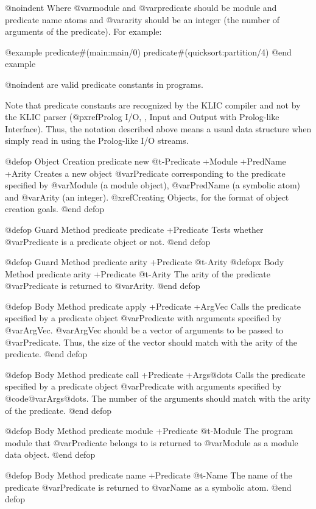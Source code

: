 {{{{@noindent
Where @var{module} and @var{predicate} should be module and predicate
name atoms and @var{arity} should be an integer (the number of arguments
of the predicate).  For example:

@example
predicate#(main:main/0)  predicate#(quicksort:partition/4)
@end example

@noindent
are valid predicate constants in programs.

Note that predicate constants are recognized by the KLIC compiler and
not by the KLIC parser (@pxref{Prolog I/O, , Input and Output with
Prolog-like Interface}).  Thus, the notation described above means a
usual data structure when simply read in using the Prolog-like I/O
streams.

@defop {Object Creation} predicate new @t{-}Predicate +Module +PredName +Arity
Creates a new object @var{Predicate} corresponding to the predicate
specified by @var{Module} (a module object), @var{PredName} (a symbolic
atom) and @var{Arity} (an integer).  @xref{Creating Objects}, for the
format of object creation goals.
@end defop

@defop {Guard Method} predicate predicate +Predicate
Tests whether @var{Predicate} is a predicate object or not.
@end defop

@defop {Guard Method} predicate arity +Predicate @t{-}Arity
@defopx {Body Method} predicate arity +Predicate @t{-}Arity
The arity of the predicate @var{Predicate} is returned to
@var{Arity}.
@end defop

@defop {Body Method} predicate apply +Predicate +ArgVec
Calls the predicate specified by a predicate object @var{Predicate} with
arguments specified by @var{ArgVec}.  @var{ArgVec} should be a vector of
arguments to be passed to @var{Predicate}.  Thus, the size of the vector
should match with the arity of the predicate.
@end defop

@defop {Body Method} predicate call +Predicate +Args@dots{}
Calls the predicate specified by a predicate object @var{Predicate} with
arguments specified by @code{@var{Args}@dots{}}.  The number of the
arguments should match with the arity of the predicate.
@end defop

@defop {Body Method} predicate module +Predicate @t{-}Module
The program module that @var{Predicate} belongs to is returned to
@var{Module} as a module data object.
@end defop

@defop {Body Method} predicate name +Predicate @t{-}Name
The name of the predicate @var{Predicate} is returned to @var{Name} as a
symbolic atom.
@end defop

}}}}
